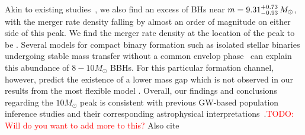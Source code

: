 \documentclass[modern]{aastex631}
\newcommand{\todo}[1]{\textcolor{red}{TODO: #1}}
\begin{document}
Akin to existing studies~\citep[e.g.,][]{KAGRA:2021duu}, we also find an excess
of BHs near $m=9.31^{+0.73}_{-0.93} \, M_\odot$, with the merger rate density
falling by almost an order of magnitude on either side of this peak. We find the
merger rate density  at the
location of the peak to be \dNlogmpeakincludingnewunits. Several models for
compact binary formation such as isolated stellar binaries undergoing stable
mass transfer without a common envelop phase~\citep{vanSon:2022myr} can explain
this abundance of $8-10M_{\odot}$ BBHs. For this particular formation channel,
however, \cite{vanSon:2022myr} predict the existence of a lower mass gap which
is not observed in our results from the most flexible model .  Overall, our findings and conclusions regarding the
$10M_{\odot}$ peak is consistent with previous GW-based population inference
studies and their corresponding astrophysical interpretations~\citep[see, e.g.,
][and references therein]{KAGRA:2021duu, vanSon:2022myr}.\todo{Will do you want
to add more to this?}   Also cite \citet{Callister2024}
\end{document}
